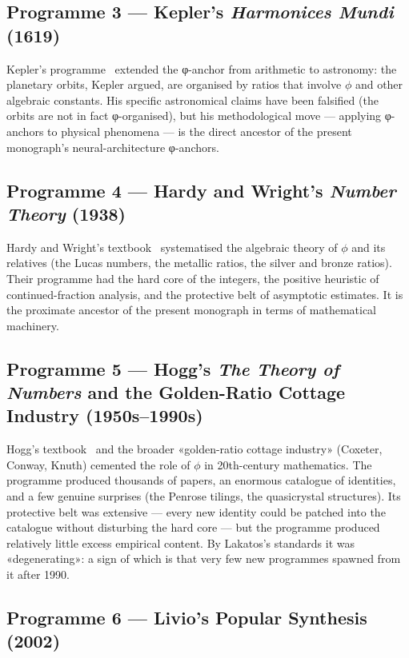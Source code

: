 \subsection{Programme 3 — Kepler's \emph{Harmonices Mundi} (1619)}
\label{sec:31-hist-kepler}

Kepler's programme~\cite{kepler_harmonices} extended the φ-anchor from arithmetic to astronomy: the planetary orbits, Kepler argued, are organised by ratios that involve $\phi$ and other algebraic constants. His specific astronomical claims have been falsified (the orbits are not in fact φ-organised), but his methodological move — applying φ-anchors to physical phenomena — is the direct ancestor of the present monograph's neural-architecture φ-anchors.

\subsection{Programme 4 — Hardy and Wright's \emph{Number Theory} (1938)}
\label{sec:31-hist-hardy}

Hardy and Wright's textbook~\cite{hardy_wright} systematised the algebraic theory of $\phi$ and its relatives (the Lucas numbers, the metallic ratios, the silver and bronze ratios). Their programme had the hard core of the integers, the positive heuristic of continued-fraction analysis, and the protective belt of asymptotic estimates. It is the proximate ancestor of the present monograph in terms of mathematical machinery.

\subsection{Programme 5 — Hogg's \emph{The Theory of Numbers} and the Golden-Ratio Cottage Industry (1950s–1990s)}
\label{sec:31-hist-hogg}

Hogg's textbook~\cite{hogg_numbers} and the broader «golden-ratio cottage industry» (Coxeter, Conway, Knuth) cemented the role of $\phi$ in 20th-century mathematics. The programme produced thousands of papers, an enormous catalogue of identities, and a few genuine surprises (the Penrose tilings, the quasicrystal structures). Its protective belt was extensive — every new identity could be patched into the catalogue without disturbing the hard core — but the programme produced relatively little excess empirical content. By Lakatos's standards it was «degenerating»: a sign of which is that very few new programmes spawned from it after 1990.

\subsection{Programme 6 — Livio's Popular Synthesis (2002)}
\label{sec:31-hist-livio}

